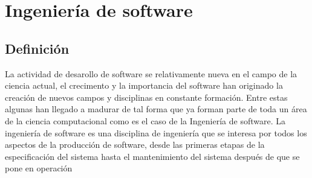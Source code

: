 \chapter{Ingeniería de software}
\section{Definición}
La actividad de desarollo de software se relativamente nueva en el campo de la ciencia actual,
el crecimento y la importancia del software han originado la creación de nuevos campos y disciplinas 
en constante formación. Entre estas algunas han llegado a madurar de tal forma que ya forman parte de toda un área de la ciencia computacional como es el caso de la Ingeniería de software. La ingeniería de software es una disciplina de ingeniería que se interesa por todos los
aspectos de la producción de software, desde las primeras etapas de la especificación del
sistema hasta el mantenimiento del sistema después de que se pone en operación\cite{9786073206037}
